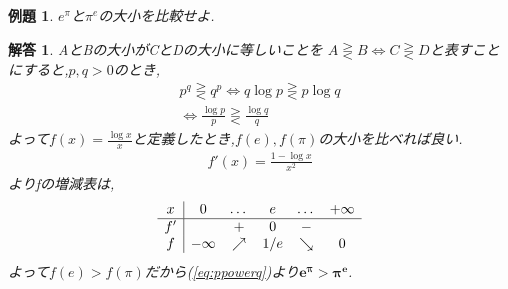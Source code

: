 \documentclass[a4paper,11pt,twocolumn,uplatex]{jsbook}
\newtheorem{example}{例題}[section]
\newtheorem*{solution}{解答}
\begin{document}
\begin{screen}
  \begin{example}
    $e^\pi$と$\pi^e$の大小を比較せよ.
  \end{example}
\end{screen}
\begin{solution}
  AとBの大小がCとDの大小に等しいことを $A \gtreqless B \Leftrightarrow C \gtreqless D$と表すことにすると,$p,q>0$のとき,
  \begin{eqnarray}
    p^q \gtreqless q^p \Leftrightarrow q \log p \gtreqless p\log q \nonumber \\
    \Leftrightarrow \frac{\log p}{p} \gtreqless \frac{\log q}{q} \label{eq:ppowerq}
  \end{eqnarray}
  よって$f(x)=\frac{\log x}{x}$と定義したとき,$f(e),f(\pi)$の大小を比べれば良い.
  \begin{eqnarray*}
    f'(x)=\frac{1-\log x}{x^2}
  \end{eqnarray*}
  よりfの増減表は,
  \begin{eqnarray*}
    \begin{array}[h]{c|ccccc}
      x&0&\dots&e&\dots&+\infty\\ \hline
      f'&&+&0&-&\\
      f&-\infty&\nearrow&1/e&\searrow&0
    \end{array}
  \end{eqnarray*}
  よって$f(e)>f(\pi)$だから(\ref{eq:ppowerq})より$\bm{e^\pi>\pi^e}$.
\end{solution}
\end{document}

